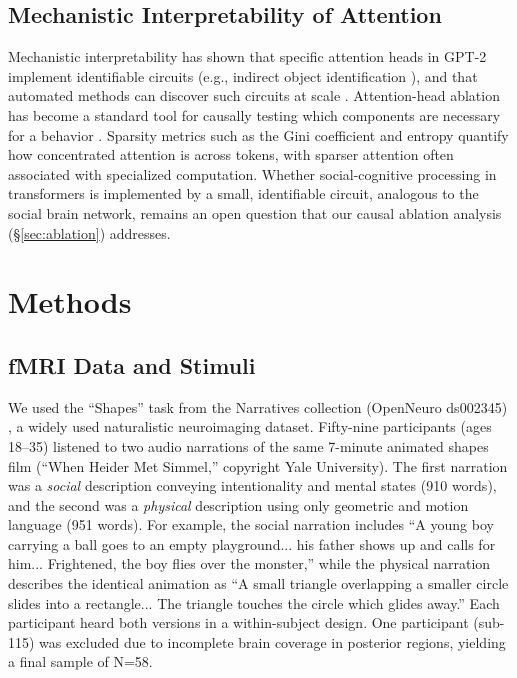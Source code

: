 \documentclass[conference]{IEEEtran}
\begin{document}
\subsection{Mechanistic Interpretability of Attention}

Mechanistic interpretability has shown that specific attention heads in GPT-2 implement identifiable circuits (e.g., indirect object identification \cite{wang2022interpretability}), and that automated methods can discover such circuits at scale \cite{conmy2023towards}. Attention-head ablation has become a standard tool for causally testing which components are necessary for a behavior \cite{elhage2021mathematical}. Sparsity metrics such as the Gini coefficient \cite{hoyer2004non} and entropy quantify how concentrated attention is across tokens, with sparser attention often associated with specialized computation. Whether social-cognitive processing in transformers is implemented by a small, identifiable circuit, analogous to the social brain network, remains an open question that our causal ablation analysis (\S\ref{sec:ablation}) addresses.

\section{Methods}

\subsection{fMRI Data and Stimuli}

We used the ``Shapes'' task from the Narratives collection (OpenNeuro ds002345) \cite{nastase2021narratives}, a widely used naturalistic neuroimaging dataset. Fifty-nine participants (ages 18--35) listened to two audio narrations of the same 7-minute animated shapes film (``When Heider Met Simmel,'' copyright Yale University). The first narration was a \textit{social} description conveying intentionality and mental states (910 words), and the second was a \textit{physical} description using only geometric and motion language (951 words). For example, the social narration includes ``A young boy carrying a ball goes to an empty playground... his father shows up and calls for him... Frightened, the boy flies over the monster,'' while the physical narration describes the identical animation as ``A small triangle overlapping a smaller circle slides into a rectangle... The triangle touches the circle which glides away.'' Each participant heard both versions in a within-subject design. One participant (sub-115) was excluded due to incomplete brain coverage in posterior regions, yielding a final sample of N=58.
\end{document}
